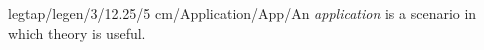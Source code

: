 legtap/legen/3/12.25/5 cm/Application/App/{An \emph{application} is a scenario in which theory is useful.}